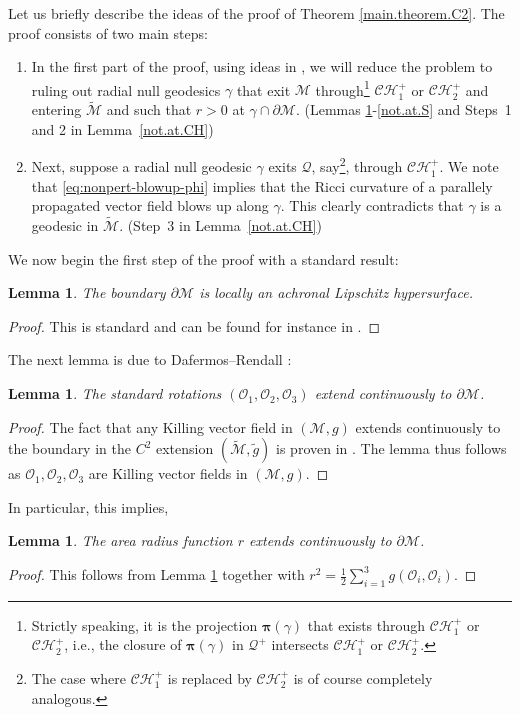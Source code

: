 \documentclass[10pt, reqno]{amsart}
\newtheorem{lemma}[theorem]{Lemma}
\theoremstyle{definition}
\theoremstyle{remark}
\numberwithin{equation}{section}
\newcommand{\rd}{\partial}
\newcommand{\0}{\emptyset}
\newcommand{\calC}{\mathcal C}
\newcommand{\calH}{\mathcal H}
\newcommand{\f}{\frac}
\newcommand{\CH}{\calC \calH^{+}}		%
\begin{document}
Let us briefly describe the ideas of the proof of Theorem \ref{main.theorem.C2}. The proof consists of two main steps:
\begin{enumerate}
\item In the first part of the proof, using ideas in \cite{Kommemi, DafRen}, we will reduce the problem to ruling out radial null geodesics $\gamma$ that exit $\mathcal M$ through\footnote{Strictly speaking, it is the projection $\boldsymbol\pi(\gamma)$ that exists through $\CH_1$ or $\CH_2$, i.e., the closure of $\boldsymbol\pi(\gamma)$ in $\mathcal Q^+$ intersects $\CH_1$ or $\CH_2$.} $\CH_1$ or $\CH_2$ and entering $\widetilde{\mathcal M}$ and such that $r>0$ at $\gamma\cap \rd\mathcal M$. (Lemmas \ref{lemma.Lipschitz}-\ref{not.at.S} and Steps~1 and 2 in Lemma~\ref{not.at.CH})
\item Next, suppose a radial null geodesic $\gamma$ exits $\mathcal Q$, say\footnote{The case where $\CH_1$ is replaced by $\CH_2$ is of course completely analogous.}, through $\CH_1$. We note that \eqref{eq:nonpert-blowup-phi} implies that the Ricci curvature of a parallely propagated vector field blows up along $\gamma$. This clearly contradicts that $\gamma$ is a geodesic in $\widetilde{\mathcal M}$. (Step~3 in Lemma~\ref{not.at.CH})
\end{enumerate}


We now begin the first step of the proof with a standard result:
\begin{lemma}\label{lemma.Lipschitz}
The boundary $\rd\mathcal M$ is locally an achronal Lipschitz hypersurface.
\end{lemma}
\begin{proof}
This is standard and can be found for instance in \cite{HawkEll}.
\end{proof}
The next lemma is due to Dafermos--Rendall \cite{DafRen}:
\begin{lemma}\label{Killing.extension}
The standard rotations $(\mathcal O_1, \mathcal O_2, \mathcal O_3)$ extend continuously to $\rd \mathcal M$.
\end{lemma}
\begin{proof}
The fact that any Killing vector field in $(\mathcal M,g)$ extends continuously to the boundary in the $C^2$ extension $(\widetilde{\mathcal M},\tilde{g})$ is proven in \cite{DafRen}. The lemma thus follows as $\mathcal O_1, \mathcal O_2, \mathcal O_3$ are Killing vector fields in $(\mathcal M, g)$.
\end{proof}
In particular, this implies,
\begin{lemma}\label{r.limit}
The area radius function $r$ extends continuously to $\rd \mathcal M$.
\end{lemma}
\begin{proof}
This follows from Lemma \ref{Killing.extension} together with $r^2=\f 12 \sum_{i=1}^3 g(\mathcal O_i,\mathcal O_i)$.
\end{proof}
\end{document}
